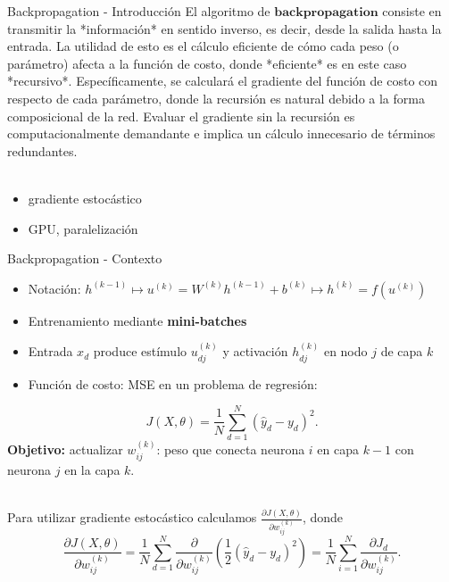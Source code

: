 \documentclass[handout, 9pt]{beamer}
\begin{document}
\begin{frame}{Backpropagation - Introducción}
El algoritmo de $\textbf{backpropagation}$ consiste en transmitir la *información* en sentido inverso, es decir, desde la salida hasta la entrada. La utilidad de esto es el cálculo eficiente de cómo cada peso (o parámetro) afecta a la función de costo, donde *eficiente* es en este caso *recursivo*. Específicamente, se calculará el gradiente del función de costo con respecto de cada parámetro, donde la recursión es natural debido a la forma composicional de la red. Evaluar el gradiente sin la recursión es computacionalmente demandante e implica un cálculo innecesario de términos redundantes.\\~\


\begin{itemize}
\item gradiente estocástico
\item GPU, paralelización
\end{itemize}




\end{frame}

\begin{frame}{Backpropagation - Contexto}

\begin{itemize}
  \item Notación: $h^{(k-1)} \mapsto u^{(k)} = W^{(k)} h^{(k-1)}  + b^{(k)} \mapsto h^{(k)} = f(u^{(k)})$ \pause

  \item Entrenamiento mediante \textbf{mini-batches}
  \item Entrada $x_d$ produce estímulo $u_{dj}^{(k)}$  y activación $h_{dj}^{(k)}$  en nodo $j$ de capa $k$ \pause
 
 \item Función de costo: MSE en un problema de regresión:  \pause

\end{itemize} 
\[
J(X , \theta) = \frac{1}{N}\sum_{d=1}^N(\hat{y}_d-y_d)^2.
\]
\textbf{Objetivo:} actualizar $w_{ij}^{(k)}$: peso que conecta neurona $i$ en capa $k-1$ con neurona $j$ en la capa $k$. \\~\

Para utilizar gradiente estocástico calculamos $\frac{\partial J(X , \theta) }{\partial w_{ij}^{(k)}}$, donde \pause
\[
\frac{\partial J(X , \theta) }{\partial w_{ij}^{(k)}} = \frac{1}{N}\sum_{d=1}^N \frac{\partial}{\partial w_{ij}^{(k)}} \left ( \frac{1}{2}(\hat{y}_d-y_d)^2 \right) = \frac{1}{N}\sum_{i=1}^N \frac{\partial J_d}{\partial w_{ij}^{(k)}}.
\]
\end{frame}
\end{document}
